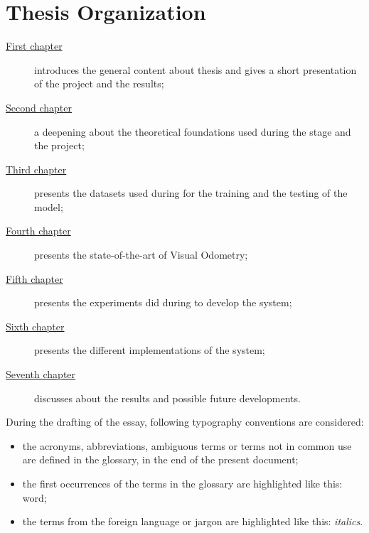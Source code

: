 \section{Thesis Organization}\label{sec:thesis-organization}
\begin{description}
    \item[{\hyperref[ch:introduction]{First chapter}}] introduces the general content about thesis and gives a short presentation of the project and the results;

    \item[{\hyperref[ch:theoretical-foundations]{Second chapter}}] a deepening about the theoretical foundations used during the stage and the project;

    \item[{\hyperref[ch:datasets]{Third chapter}}] presents the datasets used during for the training and the testing of the model;

    \item[{\hyperref[ch:state-of-the-art]{Fourth chapter}}] presents the state-of-the-art of Visual Odometry;

    \item[{\hyperref[ch:experiments]{Fifth chapter}}] presents the experiments did during to develop the system;

    \item[{\hyperref[ch:implementations]{Sixth chapter}}] presents the different implementations of the system;

    \item[{\hyperref[ch:final-discussions]{Seventh chapter}}] discusses about the results and possible future developments.
\end{description}
During the drafting of the essay, following typography conventions are considered:
\begin{itemize}
    \item the acronyms, abbreviations, ambiguous terms or terms not in common use are defined in the glossary, in the end of the present document;
    \item the first occurrences of the terms in the glossary are highlighted like this: \gls{word};
    \item the terms from the foreign language or jargon are highlighted like this: \emph{italics}.
\end{itemize}